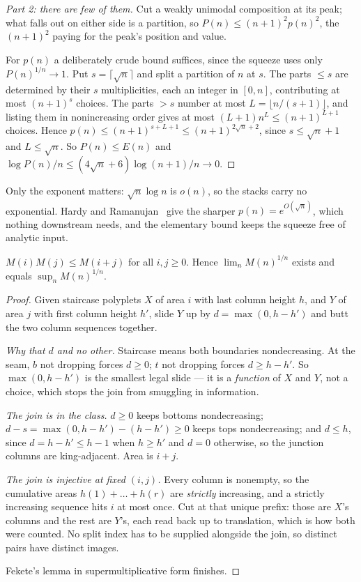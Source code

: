 \documentclass[11pt]{article}
\begin{document}
\begin{proof}[Part 2: there are few of them]
Cut a weakly unimodal composition at its peak; what falls out on either side is
a partition, so $P(n) \le (n{+}1)^2 p(n)^2$, the $(n{+}1)^2$ paying for the
peak's position and value.

For $p(n)$ a deliberately crude bound suffices, since the squeeze uses only
$P(n)^{1/n}\to1$. Put $s = \lceil\sqrt n\rceil$ and split a partition of $n$ at
$s$. The parts $\le s$ are determined by their $s$ multiplicities, each an
integer in $[0,n]$, contributing at most $(n{+}1)^s$ choices. The parts $> s$
number at most $L = \lfloor n/(s{+}1)\rfloor$, and listing them in nonincreasing
order gives at most $(L{+}1)n^L \le (n{+}1)^{L+1}$ choices. Hence
$p(n) \le (n{+}1)^{s+L+1} \le (n{+}1)^{2\sqrt n + 2}$, since $s \le \sqrt n + 1$
and $L \le \sqrt n$. So $P(n) \le E(n)$ and
$\log P(n)/n \le (4\sqrt n + 6)\log(n{+}1)/n \to 0$.
\end{proof}

Only the exponent matters: $\sqrt n \log n$ is $o(n)$, so the stacks carry no
exponential. Hardy and Ramanujan~\cite{hardyRamanujan1918} give the sharper
$p(n) = e^{O(\sqrt n)}$, which nothing downstream needs, and the elementary
bound keeps the squeeze free of analytic input.

\begin{lemma}
\label{lem:supermul}
$M(i)M(j) \le M(i+j)$ for all $i,j \ge 0$. Hence $\lim_n M(n)^{1/n}$ exists and
equals $\sup_n M(n)^{1/n}$.
\end{lemma}

\begin{proof}
Given staircase polyplets $X$ of area $i$ with last column height $h$, and $Y$ of
area $j$ with first column height $h'$, slide $Y$ up by $d = \max(0, h-h')$ and
butt the two column sequences together.

\emph{Why that $d$ and no other.} Staircase means both boundaries
nondecreasing. At the seam, $b$ not dropping forces $d \ge 0$; $t$ not dropping
forces $d \ge h - h'$. So $\max(0, h-h')$ is the smallest legal slide --- it is a
\emph{function} of $X$ and $Y$, not a choice, which stops the join from
smuggling in information.

\emph{The join is in the class.} $d \ge 0$ keeps bottoms nondecreasing;
$d - s = \max(0,h-h') - (h-h') \ge 0$ keeps tops nondecreasing; and $d \le h$,
since $d = h-h' \le h-1$ when $h \ge h'$ and $d = 0$ otherwise, so the junction
columns are king-adjacent. Area is $i+j$.

\emph{The join is injective at fixed $(i,j)$.} Every column is nonempty, so the
cumulative areas $h(1)+\dots+h(r)$ are \emph{strictly} increasing, and a
strictly increasing sequence hits $i$ at most once. Cut at that unique prefix:
those are $X$'s columns and the rest are $Y$'s, each read back up to
translation, which is how both were counted. No split index has to be supplied
alongside the join, so distinct pairs have distinct images.

Fekete's lemma in supermultiplicative form finishes.
\end{proof}
\end{document}
